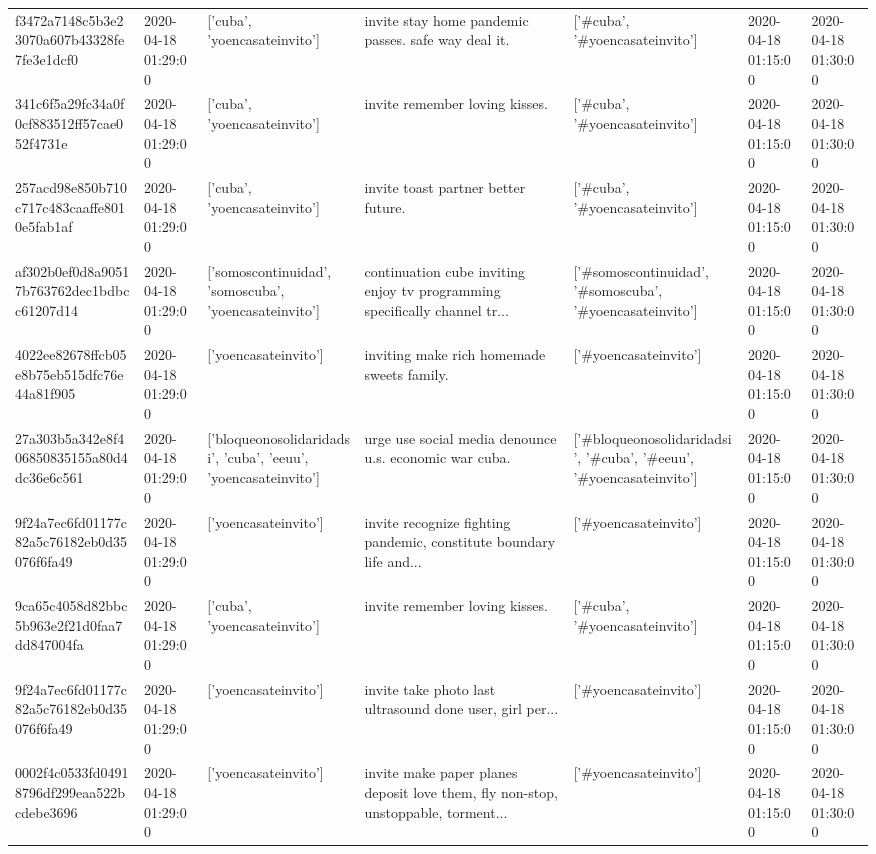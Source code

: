 \begin{tabular}{lllllll}
f3472a7148c5b3e23070a607b43328fe7fe3e1dcf0 & 2020-04-18 01:29:00 & ['cuba', 'yoencasateinvito'] & invite stay home pandemic passes. safe way deal it. & ['#cuba', '#yoencasateinvito'] & 2020-04-18 01:15:00 & 2020-04-18 01:30:00 \\
341c6f5a29fc34a0f0cf883512ff57cae052f4731e & 2020-04-18 01:29:00 & ['cuba', 'yoencasateinvito'] & invite remember loving kisses. & ['#cuba', '#yoencasateinvito'] & 2020-04-18 01:15:00 & 2020-04-18 01:30:00 \\
257acd98e850b710c717c483caaffe8010e5fab1af & 2020-04-18 01:29:00 & ['cuba', 'yoencasateinvito'] & invite toast partner better future. & ['#cuba', '#yoencasateinvito'] & 2020-04-18 01:15:00 & 2020-04-18 01:30:00 \\
af302b0ef0d8a90517b763762dec1bdbcc61207d14 & 2020-04-18 01:29:00 & ['somoscontinuidad', 'somoscuba', 'yoencasateinvito'] & continuation cube inviting enjoy tv programming specifically channel tr... & ['#somoscontinuidad', '#somoscuba', '#yoencasateinvito'] & 2020-04-18 01:15:00 & 2020-04-18 01:30:00 \\
4022ee82678ffcb05e8b75eb515dfc76e44a81f905 & 2020-04-18 01:29:00 & ['yoencasateinvito'] & inviting make rich homemade sweets family. & ['#yoencasateinvito'] & 2020-04-18 01:15:00 & 2020-04-18 01:30:00 \\
27a303b5a342e8f406850835155a80d4dc36e6c561 & 2020-04-18 01:29:00 & ['bloqueonosolidaridadsi', 'cuba', 'eeuu', 'yoencasateinvito'] & urge use social media denounce u.s. economic war cuba. & ['#bloqueonosolidaridadsi', '#cuba', '#eeuu', '#yoencasateinvito'] & 2020-04-18 01:15:00 & 2020-04-18 01:30:00 \\
9f24a7ec6fd01177c82a5c76182eb0d35076f6fa49 & 2020-04-18 01:29:00 & ['yoencasateinvito'] & invite recognize fighting pandemic, constitute boundary life and... & ['#yoencasateinvito'] & 2020-04-18 01:15:00 & 2020-04-18 01:30:00 \\
9ca65c4058d82bbc5b963e2f21d0faa7dd847004fa & 2020-04-18 01:29:00 & ['cuba', 'yoencasateinvito'] & invite remember loving kisses. & ['#cuba', '#yoencasateinvito'] & 2020-04-18 01:15:00 & 2020-04-18 01:30:00 \\
9f24a7ec6fd01177c82a5c76182eb0d35076f6fa49 & 2020-04-18 01:29:00 & ['yoencasateinvito'] & invite take photo last ultrasound done user, girl per... & ['#yoencasateinvito'] & 2020-04-18 01:15:00 & 2020-04-18 01:30:00 \\
0002f4c0533fd04918796df299eaa522bcdebe3696 & 2020-04-18 01:29:00 & ['yoencasateinvito'] & invite make paper planes deposit love them, fly non-stop, unstoppable, torment... & ['#yoencasateinvito'] & 2020-04-18 01:15:00 & 2020-04-18 01:30:00 \\

\end{tabular}
